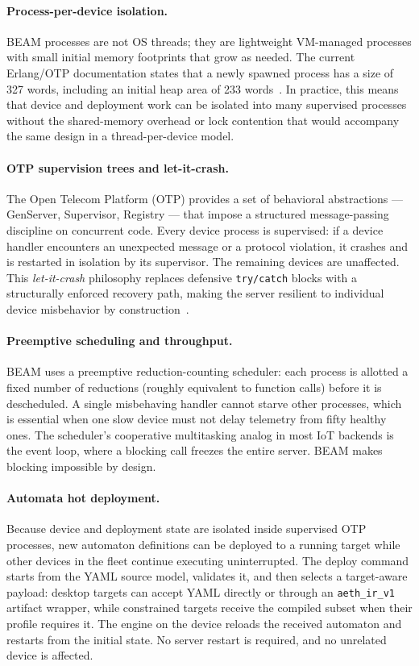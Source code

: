\paragraph{Process-per-device isolation.}
BEAM processes are not OS threads; they are lightweight VM-managed processes with small initial memory footprints that grow as needed. The current Erlang/OTP documentation states that a newly spawned process has a size of 327 words, including an initial heap area of 233 words~\cite{ErlangProcesses}. In practice, this means that device and deployment work can be isolated into many supervised processes without the shared-memory overhead or lock contention that would accompany the same design in a thread-per-device model.

\paragraph{OTP supervision trees and let-it-crash.}
The Open Telecom Platform (OTP) provides a set of behavioral abstractions --- GenServer, Supervisor, Registry --- that impose a structured message-passing discipline on concurrent code. Every device process is supervised: if a device handler encounters an unexpected message or a protocol violation, it crashes and is restarted in isolation by its supervisor. The remaining devices are unaffected. This \textit{let-it-crash} philosophy replaces defensive \texttt{try/catch} blocks with a structurally enforced recovery path, making the server resilient to individual device misbehavior by construction~\cite{Armstrong2007}.

\paragraph{Preemptive scheduling and throughput.}
BEAM uses a preemptive reduction-counting scheduler: each process is allotted a fixed number of reductions (roughly equivalent to function calls) before it is descheduled. A single misbehaving handler cannot starve other processes, which is essential when one slow device must not delay telemetry from fifty healthy ones. The scheduler's cooperative multitasking analog in most IoT backends is the event loop, where a blocking call freezes the entire server. BEAM makes blocking impossible by design.

\paragraph{Automata hot deployment.}
Because device and deployment state are isolated inside supervised OTP processes, new automaton definitions can be deployed to a running target while other devices in the fleet continue executing uninterrupted. The deploy command starts from the YAML source model, validates it, and then selects a target-aware payload: desktop targets can accept YAML directly or through an \texttt{aeth\_ir\_v1} artifact wrapper, while constrained targets receive the compiled subset when their profile requires it. The engine on the device reloads the received automaton and restarts from the initial state. No server restart is required, and no unrelated device is affected.

